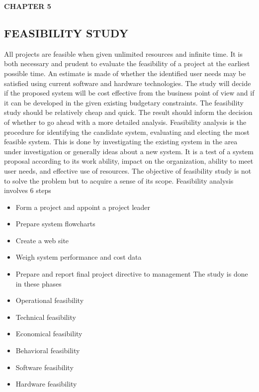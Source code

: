 \documentclass[12pt]{article}
\begin{document}
\begin{enumerate}
\newpage
\begin{flushleft}\textbf{CHAPTER 5} \end{flushleft}
\begin{flushleft}\section{FEASIBILITY STUDY} \end{flushleft}
\vspace*{10px}
All projects are feasible when given unlimited resources and infinite time. It is both
necessary and prudent to evaluate the feasibility of a project at the earliest possible
time. An estimate is made of whether the identified user needs may be satisfied using
current software and hardware technologies. The study will decide if the proposed
system will be cost effective from the business point of view and if it can be developed
in the given existing budgetary constraints. The feasibility study should be relatively
cheap and quick. The result should inform the decision of whether to go ahead with a
more detailed analysis. Feasibility analysis is the procedure for identifying the candidate
system, evaluating and electing the most feasible system. This is done by investigating
the existing system in the area under investigation or generally ideas about a new
system. It is a test of a system proposal according to its work ability, impact on the
organization, ability to meet user needs, and effective use of resources. The objective
of feasibility study is not to solve the problem but to acquire a sense of its scope.
Feasibility analysis involves 6 steps
\begin{itemize}
\item  Form a project and appoint a project leader
\item Prepare system flowcharts
\item Create a web site
\item Weigh system performance and cost data
\item Prepare and report final project directive to management The study is done in
these phases
\item Operational feasibility
\item Technical feasibility
\item Economical feasibility
\item Behavioral feasibility
\item Software feasibility
\item Hardware feasibility
\end{itemize}

\end{enumerate}
\end{document}

